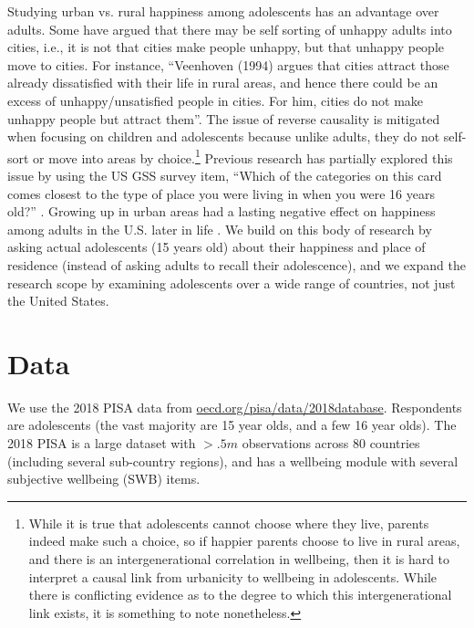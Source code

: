 \documentclass[10pt, letterpaper]{article}
\begin{document}
\begin{spacing}{1.4}
Studying urban vs. rural happiness among  adolescents has an advantage over adults. Some have argued that there may be self sorting of unhappy adults into cities, i.e., it is not that cities make people unhappy, but that unhappy people move to cities. For instance, ``Veenhoven (1994) argues that cities attract
those already dissatisfied with their life in rural areas, and hence there could
be an excess of unhappy/unsatisfied people in cities. For him, cities do not
make unhappy people but attract them''\citep[cited in][]{ebshoy24}. The issue of
reverse causality is mitigated when focusing on children and adolescents because
unlike adults, they do not self-sort or move into areas by
choice.\footnote{While it is true that adolescents cannot choose where they
  live, parents indeed make such a choice, so if happier parents choose to live
  in rural areas, and there is an intergenerational correlation in
  wellbeing, then it is hard to interpret a causal link from urbanicity to
  wellbeing in adolescents. While there is conflicting evidence as to the degree to which this
  intergenerational link exists, it is something to note nonetheless.}
Previous
research has partially explored this issue by using the US GSS survey item,
``Which of the categories on this card comes closest to the type of place you
were living in when you were 16 years old?'' \citep{aok20}. Growing up in urban
areas had a lasting negative effect on happiness among adults in the U.S. later
in life \citep{aok20}. We build on this body of research by asking actual
adolescents (15 years old) about their happiness and place of residence (instead
of asking adults to recall their adolescence), and we expand the research scope
by examining adolescents  over a wide range of countries, not just the United States. 


\section*{Data}

We use the 2018 PISA data %
 from \url{oecd.org/pisa/data/2018database}. Respondents are adolescents (the vast majority are 15 year olds, and a few 16 year olds).
The 2018 PISA is a large dataset with $>.5m$ observations across 80 %
countries (including several sub-country regions), %
 and  has a wellbeing module with several subjective wellbeing (SWB) items. 


\end{spacing}
\end{document}
